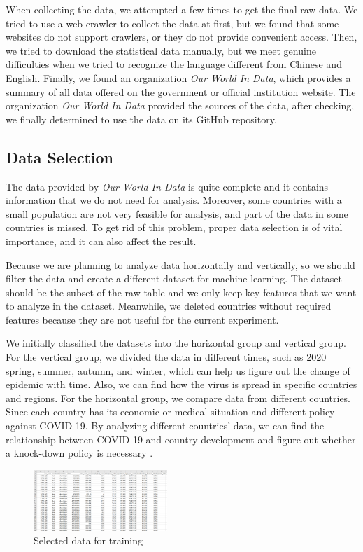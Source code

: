 \documentclass{article}
\begin{document}
\begin{multicols}{2}
When collecting the data, we attempted a few times to get the final raw data. We tried to use a web crawler to collect the data at first, but we found that some websites do not support crawlers, or they do not provide convenient access. Then, we tried to download the statistical data manually, but we meet genuine difficulties when we tried to recognize the language different from Chinese and English. Finally, we found an organization \textit{Our World In Data}, which provides a summary of all data offered on the government or official institution website. The organization \textit{Our World In Data} provided the sources of the data, after checking, we finally determined to use the data on its GitHub repository.

\subsection{Data Selection}
The data provided by \textit{Our World In Data} is quite complete and it contains information that we do not need for analysis. Moreover, some countries with a small population are not very feasible for analysis, and part of the data in some countries is missed. To get rid of this problem, proper data selection is of vital importance, and it can also affect the result.

Because we are planning to analyze data horizontally and vertically, so we should filter the data and create a different dataset for machine learning. The dataset should be the subset of the raw table and we only keep key features that we want to analyze in the dataset. Meanwhile, we deleted countries without required features because they are not useful for the current experiment.

We initially classified the datasets into the horizontal group and vertical group. For the vertical group, we divided the data in different times, such as 2020 spring, summer, autumn, and winter, which can help us figure out the change of epidemic with time. Also, we can find how the virus is spread in specific countries and regions. For the horizontal group, we compare data from different countries. Since each country has its economic or medical situation and different policy against COVID-19. By analyzing different countries’ data, we can find the relationship between COVID-19 and country development and figure out whether a knock-down policy is necessary \cite{thompson2021interim,roser2020coronavirus}. 

\begin{figure}[H]
    \centering
    \includegraphics[width=0.45\textwidth]{selecteddata.png}
    \caption{Selected data for training}
\end{figure}


\end{multicols}
\end{document}

